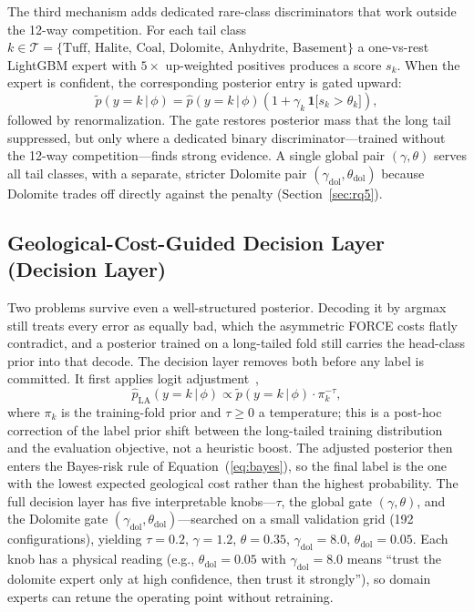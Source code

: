 \documentclass[bdcc,article,submit,pdftex,moreauthors]{Definitions/mdpi}
\begin{document}
The third mechanism adds dedicated rare-class discriminators that work outside the 12-way
competition. For each tail class $k\in\mathcal T=\{\text{Tuff, Halite,
Coal, Dolomite, Anhydrite, Basement}\}$ a one-vs-rest LightGBM expert with $5\times$
up-weighted positives produces a score $s_k$. When the expert is confident, the corresponding
posterior entry is gated upward:
\begin{equation}
\tilde p(y=k\,|\,\phi) = \hat p(y=k\,|\,\phi)\!\left(1+\gamma_k\,\mathbf 1\bigl[s_k>\theta_k\bigr]\right),
\label{eq:gate}
\end{equation}
followed by renormalization. The gate restores posterior mass that the long tail suppressed,
but only where a dedicated binary discriminator---trained without the 12-way
competition---finds strong evidence. A single global pair $(\gamma,\theta)$ serves all tail
classes, with a separate, stricter Dolomite pair $(\gamma_\text{dol},\theta_\text{dol})$
because Dolomite trades off directly against the penalty (Section~\ref{sec:rq5}).

\subsection{Geological-Cost-Guided Decision Layer (Decision Layer)}
\label{sec:decision}
Two problems survive even a well-structured posterior. Decoding it by argmax still treats
every error as equally bad, which the asymmetric FORCE costs flatly contradict, and a
posterior trained on a long-tailed fold still carries the head-class prior into that decode.
The decision layer removes both before any label is committed. It first applies logit
adjustment~\cite{menon2021logit},
\begin{equation}
\hat p_\text{LA}(y=k\,|\,\phi)\propto \tilde p(y=k\,|\,\phi)\cdot \pi_k^{-\tau},
\label{eq:logitadj}
\end{equation}
where $\pi_k$ is the training-fold prior and $\tau\geq 0$ a temperature; this is a post-hoc
correction of the label prior shift between the long-tailed training distribution and the
evaluation objective, not a heuristic boost. The adjusted posterior then enters the
Bayes-risk rule of Equation~(\ref{eq:bayes}), so the final label is the one with the lowest
expected geological cost rather than the highest probability. The full decision layer has
five interpretable knobs---$\tau$, the global gate $(\gamma,\theta)$, and the Dolomite gate
$(\gamma_\text{dol},\theta_\text{dol})$---searched on a small validation grid (192
configurations), yielding $\tau=0.2$, $\gamma=1.2$, $\theta=0.35$,
$\gamma_\text{dol}=8.0$, $\theta_\text{dol}=0.05$. Each knob has a physical reading (e.g.,
$\theta_\text{dol}=0.05$ with $\gamma_\text{dol}=8.0$ means ``trust the dolomite expert only
at high confidence, then trust it strongly''), so domain experts can retune the operating
point without retraining.
\end{document}
